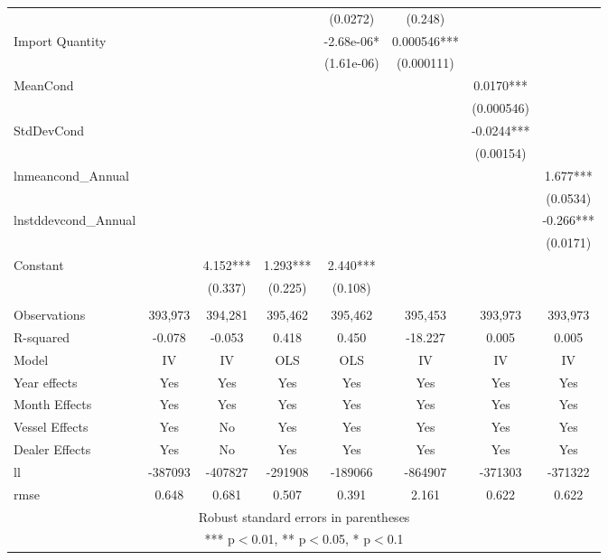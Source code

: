 \begin{tabular}{lccccccc}
 &  &  &  & (0.0272) & (0.248) &  &  \\
Import Quantity &  &  &  & -2.68e-06* & 0.000546*** &  &  \\
 &  &  &  & (1.61e-06) & (0.000111) &  &  \\
MeanCond &  &  &  &  &  & 0.0170*** &  \\
 &  &  &  &  &  & (0.000546) &  \\
StdDevCond &  &  &  &  &  & -0.0244*** &  \\
 &  &  &  &  &  & (0.00154) &  \\
lnmeancond\_Annual &  &  &  &  &  &  & 1.677*** \\
 &  &  &  &  &  &  & (0.0534) \\
lnstddevcond\_Annual &  &  &  &  &  &  & -0.266*** \\
 &  &  &  &  &  &  & (0.0171) \\
Constant &  & 4.152*** & 1.293*** & 2.440*** &  &  &  \\
 &  & (0.337) & (0.225) & (0.108) &  &  &  \\
 &  &  &  &  &  &  &  \\
Observations & 393,973 & 394,281 & 395,462 & 395,462 & 395,453 & 393,973 & 393,973 \\
R-squared & -0.078 & -0.053 & 0.418 & 0.450 & -18.227 & 0.005 & 0.005 \\
Model & IV & IV & OLS & OLS & IV & IV & IV \\
Year effects & Yes & Yes & Yes & Yes & Yes & Yes & Yes \\
Month Effects & Yes & Yes & Yes & Yes & Yes & Yes & Yes \\
Vessel Effects & Yes & No & Yes & Yes & Yes & Yes & Yes \\
Dealer Effects & Yes & No & Yes & Yes & Yes & Yes & Yes \\
ll & -387093 & -407827 & -291908 & -189066 & -864907 & -371303 & -371322 \\
 rmse & 0.648 & 0.681 & 0.507 & 0.391 & 2.161 & 0.622 & 0.622 \\ \hline
\multicolumn{8}{c}{ Robust standard errors in parentheses} \\
\multicolumn{8}{c}{ *** p$<$0.01, ** p$<$0.05, * p$<$0.1} \\
\end{tabular}
